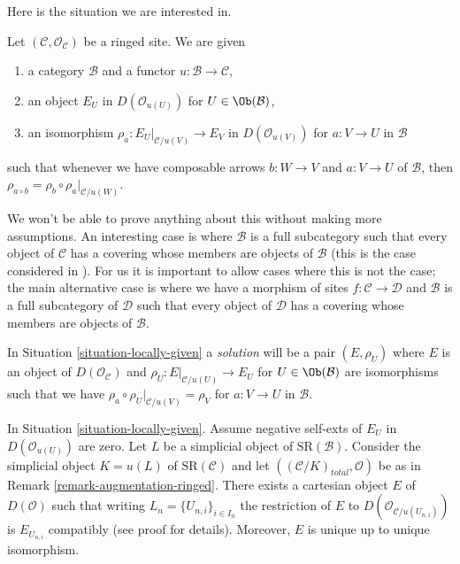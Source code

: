 \medskip\noindent
Here is the situation we are interested in.

\begin{situation}
\label{situation-locally-given}
Let $(\mathcal{C}, \mathcal{O}_\mathcal{C})$ be a ringed site. We are given
\begin{enumerate}
\item a category $\mathcal{B}$ and a functor
$u : \mathcal{B} \to \mathcal{C}$,
\item an object $E_U$ in $D(\mathcal{O}_{u(U)})$ for $U \in \Ob(\mathcal{B})$,
\item an isomorphism $\rho_a : E_U|_{\mathcal{C}/u(V)} \to E_V$ in
$D(\mathcal{O}_{u(V)})$ for $a : V \to U$ in $\mathcal{B}$
\end{enumerate}
such that whenever we have composable arrows
$b : W \to V$ and $a : V \to U$ of $\mathcal{B}$, then
$\rho_{a \circ b} = \rho_b \circ \rho_a|_{\mathcal{C}/u(W)}$.
\end{situation}

\noindent
We won't be able to prove anything about this without making more
assumptions. An interesting case is where $\mathcal{B}$ is a full
subcategory such that every object of $\mathcal{C}$ has a covering
whose members are objects of $\mathcal{B}$ (this is the case considered
in \cite{BBD}). For us it is important to allow cases where this is not
the case; the main alternative case is where we have a morphism
of sites $f : \mathcal{C} \to \mathcal{D}$ and $\mathcal{B}$
is a full subcategory of $\mathcal{D}$ such that every object of
$\mathcal{D}$ has a covering whose members are objects of $\mathcal{B}$.

\medskip\noindent
In Situation \ref{situation-locally-given} a {\it solution}
will be a pair $(E, \rho_U)$ where $E$ is an object of
$D(\mathcal{O}_\mathcal{C})$
and $\rho_U : E|_{\mathcal{C}/u(U)} \to E_U$
for $U \in \Ob(\mathcal{B})$
are isomorphisms such that
we have $\rho_a \circ \rho_U|_{\mathcal{C}/u(V)} = \rho_V$
for $a : V \to U$ in $\mathcal{B}$.

\begin{lemma}
\label{lemma-prepare-bbd-glueing}
In Situation \ref{situation-locally-given}.
Assume negative self-exts of $E_U$ in $D(\mathcal{O}_{u(U)})$ are zero.
Let $L$ be a simplicial object of $\text{SR}(\mathcal{B})$.
Consider the simplicial object $K = u(L)$ of $\text{SR}(\mathcal{C})$
and let $((\mathcal{C}/K)_{total}, \mathcal{O})$ be as in
Remark \ref{remark-augmentation-ringed}.
There exists a cartesian object $E$ of $D(\mathcal{O})$
such that writing $L_n = \{U_{n, i}\}_{i \in I_n}$
the restriction of $E$ to $D(\mathcal{O}_{\mathcal{C}/u(U_{n, i})})$
is $E_{U_{n, i}}$ compatibly (see proof for details).
Moreover, $E$ is unique up to unique isomorphism.
\end{lemma}

